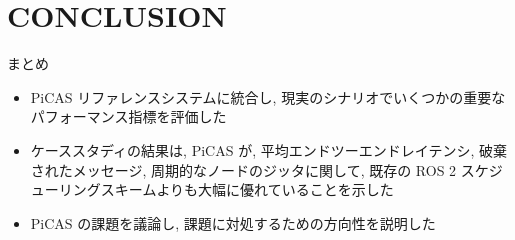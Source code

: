 
\section{CONCLUSION}
\label{sec: conclusion}

\begin{frame}{まとめ}
    \begin{itemize}
        \item PiCAS リファレンスシステムに統合し, 現実のシナリオでいくつかの重要なパフォーマンス指標を評価した
        \item ケーススタディの結果は, PiCAS が, 平均エンドツーエンドレイテンシ, 破棄されたメッセージ, 周期的なノードのジッタに関して, 既存の ROS 2 スケジューリングスキームよりも大幅に優れていることを示した
        \item PiCAS の課題を議論し, 課題に対処するための方向性を説明した
    \end{itemize}
\end{frame}


